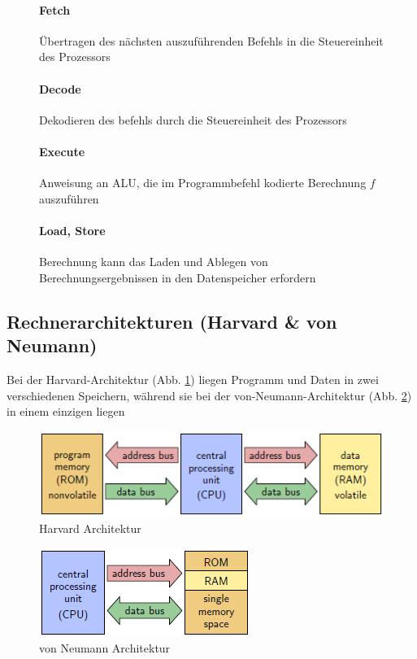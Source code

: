 \documentclass[12pt]{report}
\begin{document}
\begin{figure}[H]
  \begin{minipage}[t]{0.45\textwidth}
    \paragraph*{Fetch} Übertragen des nächsten auszuführenden Befehls in die Steuereinheit des Prozessors
    
    \paragraph*{Decode} Dekodieren des befehls durch die Steuereinheit des Prozessors
  \end{minipage}
  \hfill
  \begin{minipage}[t]{0.45\textwidth}
    \paragraph*{Execute} Anweisung an ALU, die im Programmbefehl kodierte Berechnung $f$ auszuführen
    
    \paragraph*{Load, Store} Berechnung kann das Laden und Ablegen von Berechnungsergebnissen in den Datenspeicher erfordern
  \end{minipage}
\end{figure}


\subsection{Rechnerarchitekturen (Harvard \& von Neumann)}



Bei der Harvard-Architektur (Abb. \ref{fig:harvard_architektur}) liegen Programm und Daten in zwei verschiedenen Speichern, während sie
bei der von-Neumann-Architektur (Abb. \ref{fig:von_neumann_architektur}) in einem einzigen liegen
\begin{figure}[H]
  \caption{Harvard Architektur}
  \label{fig:harvard_architektur}
  \centering
  \includegraphics{harvard_architektur}
\end{figure}
\begin{figure}[H]
  \caption{von Neumann Architektur}
  \label{fig:von_neumann_architektur}
  \centering
  \includegraphics{von_neumann_architektur}
\end{figure}
\end{document}

